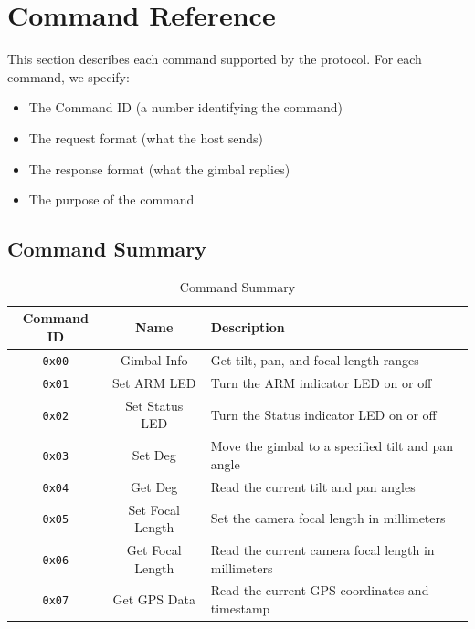 \documentclass[12pt, titlepage]{article}
\begin{document}
\section{Command Reference}

This section describes each command supported by the protocol. For each
command, we specify:
\begin{itemize}
  \item The Command ID (a number identifying the command)
  \item The request format (what the host sends)
  \item The response format (what the gimbal replies)
  \item The purpose of the command
\end{itemize}

\subsection{Command Summary}

\begin{table}[H]
  \centering
  \begin{tabularx}{\textwidth}{ccX}
    \toprule
    \textbf{Command ID} & \textbf{Name}    & \textbf{Description}                                \\
    \midrule
    \texttt{0x00}       & Gimbal Info      & Get tilt, pan, and focal length ranges              \\
    \texttt{0x01}       & Set ARM LED      & Turn the ARM indicator LED on or off                \\
    \texttt{0x02}       & Set Status LED   & Turn the Status indicator LED on or off             \\
    \texttt{0x03}       & Set Deg          & Move the gimbal to a specified tilt and pan angle   \\
    \texttt{0x04}       & Get Deg          & Read the current tilt and pan angles                \\
    \texttt{0x05}       & Set Focal Length & Set the camera focal length in millimeters          \\
    \texttt{0x06}       & Get Focal Length & Read the current camera focal length in millimeters \\
    \texttt{0x07}       & Get GPS Data     & Read the current GPS coordinates and timestamp      \\
    \bottomrule
  \end{tabularx}
  \caption{Command Summary}
\end{table}
\end{document}
